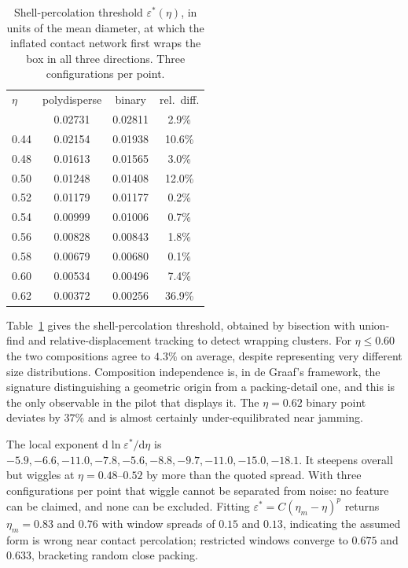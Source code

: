 \documentclass[11pt]{article}
\newenvironment{ruledtabular}{}{}
\begin{document}
\begin{table}[t]
\caption{Shell-percolation threshold $\varepsilon^*(\eta)$, in units of the mean
diameter, at which the inflated contact network first wraps the box in all three
directions. Three configurations per point.}
\label{tab:perc}
\begin{ruledtabular}
\begin{tabular}{lccc}
$\eta$ & polydisperse & binary & rel.\ diff.\\
\colrule
0.40 & 0.02731 & 0.02811 & 2.9\%\\
0.44 & 0.02154 & 0.01938 & 10.6\%\\
0.48 & 0.01613 & 0.01565 & 3.0\%\\
0.50 & 0.01248 & 0.01408 & 12.0\%\\
0.52 & 0.01179 & 0.01177 & 0.2\%\\
0.54 & 0.00999 & 0.01006 & 0.7\%\\
0.56 & 0.00828 & 0.00843 & 1.8\%\\
0.58 & 0.00679 & 0.00680 & 0.1\%\\
0.60 & 0.00534 & 0.00496 & 7.4\%\\
0.62 & 0.00372 & 0.00256 & 36.9\%\\
\end{tabular}
\end{ruledtabular}
\end{table}

Table~\ref{tab:perc} gives the shell-percolation threshold, obtained by bisection
with union-find and relative-displacement tracking to detect wrapping clusters.
For $\eta\leq0.60$ the two compositions agree to $4.3\%$ on average, despite
representing very different size distributions. Composition independence is, in
de Graaf's framework, the signature distinguishing a geometric origin from a
packing-detail one, and this is the only observable in the pilot that displays
it. The $\eta=0.62$ binary point deviates by $37\%$ and is almost certainly
under-equilibrated near jamming.

The local exponent $\mathrm{d}\ln\varepsilon^*/\mathrm{d}\eta$ is
$-5.9,-6.6,-11.0,-7.8,-5.6,-8.8,-9.7,-11.0,-15.0,-18.1$. It steepens overall but
wiggles at $\eta=0.48$--$0.52$ by more than the quoted spread. With three
configurations per point that wiggle cannot be separated from noise: no feature
can be claimed, and none can be excluded. Fitting
$\varepsilon^*=C(\eta_m-\eta)^p$ returns $\eta_m=0.83$ and $0.76$ with window
spreads of $0.15$ and $0.13$, indicating the assumed form is wrong near contact
percolation; restricted windows converge to $0.675$ and $0.633$, bracketing
random close packing.
\end{document}
